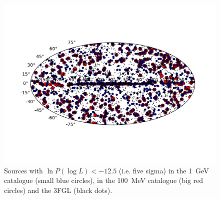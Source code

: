 \documentclass[useAMS,usenatbib]{mn2e}
\begin{document}
\begin{table}
\begin{tabular}{lrrrrrrrrrrr}
\end{tabular}
\end{table}

\begin{figure}
  \includegraphics[width=\textwidth,clip,trim=0.6in 1in 0.8in
    1in]{source_plot}
  \caption{Sources with $\ln P(\log L)<-12.5$ (i.e. five sigma) in the
    1~GeV catalogue (small blue circles), in the 100~MeV catalogue
    (big red circles) and the 3FGL (black dots).}
  \label{fig:sources}
\end{figure}
\end{document}
